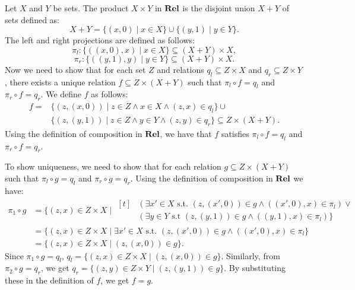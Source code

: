 \begin{solution}\label{sol:product_rel}
	Let $X$ and $Y$ be sets. The product $X \times Y$ in $\mathbf{Rel}$ is the disjoint union $X + Y$ of sets defined as:
	\[ X + Y = \{ (x,0) \mid x \in X \} \cup  \{ (y,1) \mid y \in Y \}. \]
	The left and right projections are defined as follows:
	\[ \pi_l : \{ ((x,0),x) \mid x \in X \} \subseteq (X + Y) \times X, \]
	\[ \pi_r : \{ ((y,1),y) \mid y \in Y \} \subseteq (X + Y) \times X. \]
	Now we need to show that for each set $Z$ and relations $q_l \subseteq Z \times X$ and $q_r \subseteq Z \times Y$, there exists a unique relation $f \subseteq Z \times (X + Y)$ such that $\pi_l \circ f = q_l$ and $\pi_r \circ f = q_r$.
	We define $f$ as follows:
	\begin{align*}
		f = & \{ (z,(x,0)) \mid z \in Z \wedge x \in X \wedge (z,x) \in q_l \} \cup \\
			& \{ (z,(y,1)) \mid z \in Z \wedge y \in Y \wedge (z,y) \in q_r \} \subseteq Z \times (X + Y) .
	\end{align*}
	Using the definition of composition in $\mathbf{Rel}$, we have that $f$ satisfies $\pi_l \circ f = q_l$ and $\pi_r \circ f = q_r$. 

	To show uniqueness, we need to show that for each relation $g \subseteq Z \times (X + Y)$ such that $\pi_l \circ g = q_l$ and $\pi_r \circ g = q_r$. 
	Using the definition of composition in $\mathbf{Rel}$ we have: 
	\begin{align*}
		\pi_1 \circ g & = \{ (z,x) \in Z \times X \mid
		\begin{aligned}[t]
			& (\exists x' \in X \text{ s.t. } (z, (x',0)) \in g \wedge ((x',0),x) \in \pi_l) \vee \\ 
			& (\exists y \in Y \text{ s.t } (z,(y,1)) \in g \wedge ((y,1),x) \in \pi_l) \} 
		\end{aligned} \\
		& = \{ (z,x) \in Z \times X \mid \exists x' \in X \text{ s.t. } (z, (x',0)) \in g \wedge ((x',0),x) \in \pi_l \} \\
		& = \{ (z,x) \in Z \times X \mid (z, (x,0)) \in g \}. 
	\end{align*}
	Since $\pi_1 \circ g = q_l$, $q_l = \{ (z,x) \in Z \times X \mid (z, (x,0)) \in g \}$. Similarly, from $\pi_2 \circ g = q_r$, we get $q_r = \{ (z,y) \in Z \times Y \mid (z, (y,1)) \in g \}$. By substituting these in the definition of $f$, we get $f = g$.
\end{solution}

